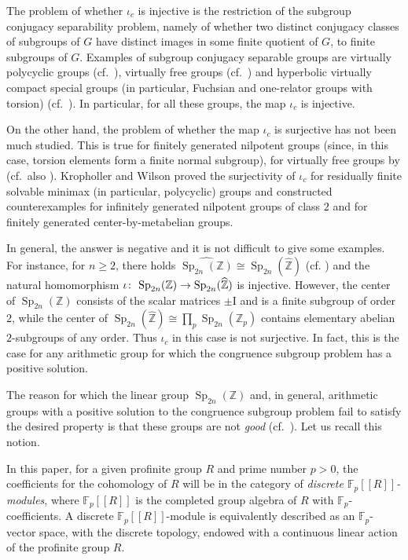 \documentclass[12pt,twoside]{amsart}
\newcommand\Z{{\mathbb Z}}
\newcommand\ZZ{\widehat{\mathbb Z}}
\newcommand\F{{\mathbb F}}
\newcommand\Sp{\operatorname{Sp}}
\newcommand\wh{\widehat}
\def\co{\colon\thinspace}
\theoremstyle{definition}
\begin{document}
The problem of whether $\iota_c$ is injective is the restriction of the subgroup conjugacy separability problem, namely of whether two distinct
conjugacy classes of subgroups of $G$ have distinct images in some finite quotient of $G$, to finite subgroups of $G$. 
Examples of subgroup conjugacy separable groups are virtually polycyclic groups (cf.\ \cite{GS}), virtually free groups (cf.\ \cite{CZ-15}) and hyperbolic 
virtually compact special groups (in particular, Fuchsian and  one-relator groups with torsion) (cf.\ \cite{CZ-19}). In particular, for all these groups, the map 
$\iota_c$ is injective.

On the other hand, the problem of whether the map $\iota_c$ is surjective has not been much studied. 
This is true for finitely generated nilpotent groups (since, in this case, torsion elements form a finite normal subgroup), for virtually free groups 
by \cite[Theorem 3.10]{ZM} (cf.\ also \cite[Theorem 1.2]{R}). Kropholler and Wilson \cite[Theorem 2.7]{KW} proved the surjectivity of $\iota_c$ 
for residually finite solvable minimax (in particular, polycyclic) groups and constructed counterexamples for infinitely generated nilpotent groups 
of class $2$ and for finitely generated center-by-metabelian groups.

In general, the answer is negative and it is not difficult to give some examples. For instance, for $n\geq 2$,
there holds $\wh{\Sp_{2n}(\Z)}\cong\Sp_{2n}(\ZZ)$ (cf. \cite{BMS}) and the natural homomorphism
$\iota\co\Sp_{2n}(\Z)\to\Sp_{2n}(\ZZ)$ is injective. However, the center of $\Sp_{2n}(\Z)$ consists of the scalar
matrices $\pm{\mathrm I}$ and is a finite subgroup of order $2$, while the center of $\Sp_{2n}(\ZZ)\cong\prod_p\Sp_{2n}(\Z_p)$ contains elementary 
abelian $2$-subgroups of any order. Thus $\iota_c$ in this case is not surjective. In fact, this is the case for any arithmetic group for which the congruence 
subgroup problem has a positive solution.

The reason for which the linear group $\Sp_{2n}(\Z)$ and, in general, arithmetic groups with a positive solution to the congruence subgroup problem fail 
to satisfy the desired property is that these groups are not \emph{good} (cf.\ \cite[Proposition 5.1 and Remark 5.3]{GJZ}). Let us recall this notion.

In this paper, for a given profinite group $R$ and prime number $p>0$, the coefficients for the cohomology of $R$ will be in the category 
of \emph{discrete  $\F_p[[R]]$-modules}, where $\F_p[[R]]$ is the completed group algebra of $R$ with $\F_p$-coefficients. 
A discrete $\F_p[[R]]$-module is equivalently described as an $\F_p$-vector space, with the discrete topology, endowed with a continuous linear action 
of the profinite group $R$.
\end{document}
